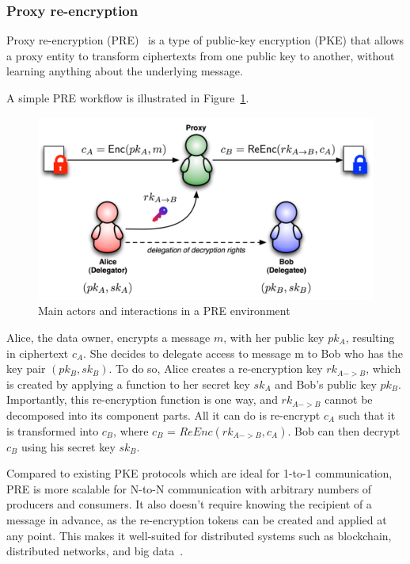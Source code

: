 \documentclass[notitlepage,longbibliography]{revtex4-1}
\begin{document}
\subsubsection{Proxy re-encryption}
Proxy re-encryption (PRE)~\cite{wiki:pre,phd:nunez} is a type of public-key encryption (PKE) that allows a proxy entity to transform ciphertexts
from one public key to another, without learning anything about the underlying message.

A simple PRE workflow is illustrated in Figure~\ref{fig-pre}.

\begin{figure}
\centering
\includegraphics[width=\columnwidth]{pre.png}
\caption{Main actors and interactions in a PRE environment}\label{fig-pre}
\end{figure}

Alice, the data owner, encrypts a message $m$, with her public key $pk_{A}$, resulting in ciphertext $c_{A}$.
She decides to delegate access to message m to Bob who has the key pair $(pk_{B}, sk_{B})$.
To do so, Alice creates a re-encryption key $rk_{A->B}$, which is created by applying a function to her secret key $sk_{A}$ and
Bob’s public key $pk_{B}$.
Importantly, this re-encryption function is one way, and $rk_{A->B}$ cannot be decomposed into its component parts.
All it can do is re-encrypt $c_{A}$ such that it is transformed into $c_{B}$, where $c_{B}$ = $ReEnc(rk_{A->B}, c_{A})$.
Bob can then decrypt $c_{B}$ using his secret key $sk_{B}$.

Compared to existing PKE protocols which are ideal for 1-to-1 communication, PRE is more scalable for N-to-N communication
with arbitrary numbers of producers and consumers.
It also doesn't require knowing the recipient of a message in advance, as the re-encryption tokens can be created and applied at any point.
This makes it well-suited for distributed systems such as blockchain, distributed networks, and big data~\cite{web:nucypher-hadoop}.
\end{document}
